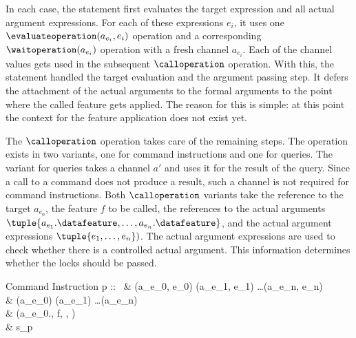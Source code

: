 In each case, the statement first evaluates the target expression and all actual argument expressions. For each of these expressions $e_{i}$, it uses one $\evaluateoperation(a_{e_{i}}, e_{i})$ operation and a corresponding $\waitoperation(a_{e_{i}})$ operation with a fresh channel $a_{e_{i}}$. Each of the channel values gets used in the subsequent $\calloperation$ operation. With this, the statement handled the target evaluation and the argument passing step. It defers the attachment of the actual arguments to the formal arguments to the point where the called feature gets applied. The reason for this is simple: at this point the context for the feature application does not exist yet.

The $\calloperation$ operation takes care of the remaining steps. The operation exists in two variants, one for command instructions and one for queries. The variant for queries takes a channel $a'$ and uses it for the result of the query. Since a call to a command does not produce a result, such a channel is not required for command instructions. Both $\calloperation$ variants take the reference to the target $a_{e_{0}}$, the feature $f$ to be called, the references to the actual arguments $\tuple{a_{e_{1}}.\datafeature, \ldots, a_{e_{n}}.\datafeature}$, and the actual argument expressions $\tuple{e_{1}, \ldots, e_{n}})$. The actual argument expressions are used to check whether there is a controlled actual argument. This information determines whether the locks should be passed.

\inferencerule
	{Command Instruction}
	{ }
	{}
	{
		\configuration
			{
				p :: \ & \evaluateoperation(a_{e_{0}}, e_{0}) \statementseparator \evaluateoperation(a_{e_{1}}, e_{1}) \statementseparator \ldots \statementseparator \evaluateoperation(a_{e_{n}}, e_{n}) \statementseparator \\
				& \waitoperation(a_{e_{0}}) \statementseparator \waitoperation(a_{e_{1}}) \statementseparator \ldots \statementseparator \waitoperation(a_{e_{n}}) \statementseparator \\
				& \calloperation(a_{e_{0}}.\datafeature, f, , ) \statementseparator \\
				& s_{p}
			}
			{\state}
	}
 
